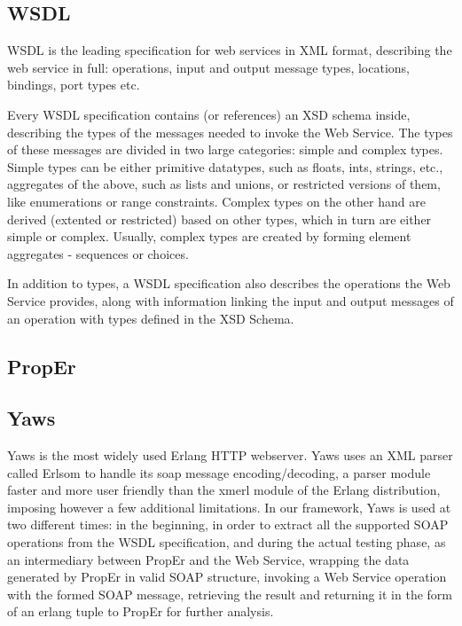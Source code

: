 \documentclass[submission,copyright,a4]{eptcs}
\begin{document}
\subsection{WSDL}

WSDL is the leading specification for web services in XML format, describing the web service in full: operations, input and output message types, locations, bindings, port types etc. 

Every WSDL specification contains (or references) an XSD schema inside, describing the types of the messages needed to invoke the Web Service. The types of these messages are divided in two large categories: simple and complex types. Simple types can be either primitive datatypes, such as floats, ints, strings, etc., aggregates of the above, such as lists and unions, or restricted versions of them, like enumerations or range constraints. Complex types on the other hand are derived (extented or restricted) based on other types, which in turn are either simple or complex. Usually, complex types are created by forming element aggregates - sequences or choices. 

In addition to types, a WSDL specification also describes the operations the Web Service provides, along with information linking the input and output messages of an operation with types defined in the XSD Schema. 

\subsection{PropEr}

\subsection{Yaws}

Yaws is the most widely used Erlang HTTP webserver. Yaws uses an XML parser called Erlsom to handle its soap message encoding/decoding, a parser module faster and more user friendly than the xmerl module of the Erlang distribution, imposing however a few additional limitations. In our framework, Yaws is used at two different times: in the beginning, in order to extract all the supported SOAP operations from the WSDL specification, and during the actual testing phase, as an intermediary between PropEr and the Web Service, wrapping the data generated by PropEr in valid SOAP structure, invoking a Web Service operation with the formed SOAP message, retrieving the result and returning it in the form of an erlang tuple to PropEr for further analysis.
\end{document}
